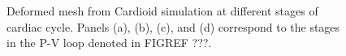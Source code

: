 \begin{figure}[ht!]
\centering
{}		
%
\caption{Deformed mesh from Cardioid simulation at different stages of cardiac cycle. Panels (a), (b), (c), and (d) correspond to the stages in the P-V loop denoted in FIGREF ???.}
\label{fig:snaps}
\end{figure}

